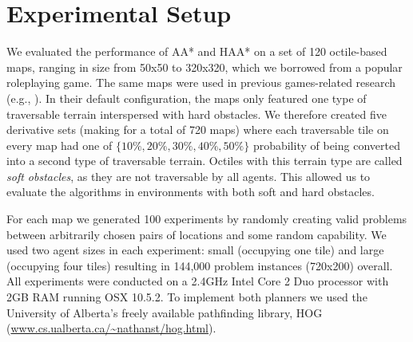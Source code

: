 \section{Experimental Setup}
We evaluated the performance of AA* and HAA* on a set of 120 octile-based maps, ranging in size from 50x50 to 320x320, which we borrowed from a popular roleplaying game.
The same maps were used in previous games-related research (e.g., \cite{botea04}).
In their default configuration, the maps only featured one type of traversable terrain interspersed with hard obstacles. 
We therefore created five derivative sets (making for a total of 720 maps) where each traversable tile on every map had one of $\lbrace 10\%, 20\%, 30\%, 40\%, 50\% \rbrace$ probability of being converted into a second type of traversable terrain. Octiles with this terrain type are called \emph{soft obstacles}, as they are not traversable by all agents.
This allowed us to evaluate the algorithms in environments with both soft and hard obstacles.
\par \indent
For each map we generated 100 experiments by randomly creating valid problems between arbitrarily chosen pairs of locations and some random capability.
We used two agent sizes in each experiment: small (occupying one tile) and large (occupying four tiles) resulting in 144,000 problem instances (720x200) overall.
All experiments were conducted on a 2.4GHz Intel Core 2 Duo processor with 2GB RAM running OSX 10.5.2.
To implement both planners we used the University of Alberta's freely available pathfinding library, HOG (\url{www.cs.ualberta.ca/~nathanst/hog.html}). 
